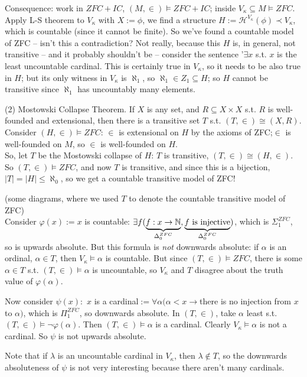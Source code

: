 \documentclass[a4paper]{article}
\begin{document}
Consequence: work in $ZFC+IC$, $(M,\in) \vDash ZFC+IC$; inside $V_\kappa \subseteq M \vDash ZFC$. Apply L-S theorem to $V_\kappa$ with $X:=\phi$, we find a structure $H:=\mathcal{H}^{V_\kappa} (\phi) \prec V_\kappa$, which is countable (since it cannot be finite). So we've found a countable model of ZFC -- isn't this a contradiction? Not really, because this $H$ is, in general, not transitive -- and it probably shouldn't be -- consider the sentence '$\exists x$ s.t. $x$ is the least uncountable cardinal. This is certainly true in $V_\kappa$, so it needs to be also true in $H$; but its only witness in $V_\kappa$ is $\aleph_1$, so $\aleph_1 \in Z_1 \subseteq H$; so $H$ cannot be transitive since $\aleph_1$ has uncountably many elements.

(2) Mostowski Collapse Theorem. If $X$ is any set, and $R \subseteq X \times X$ s.t. $R$ is well-founded and extensional, then there is a transitive set $T$ s.t. $(T,\in) \cong (X,R)$. Consider $(H,\in) \vDash ZFC$: $\in$ is extensional on $H$ by the axioms of ZFC;$\in$ is well-founded on $M$, so $\in$ is well-founded on $H$.\\
So, let $T$ be the Mostowski collapse of $H$: $T$ is transitive, $(T,\in) \cong (H,\in)$. So $(T,\in) \vDash ZFC$, and now $T$ is transitive, and since this is a bijection, $|T| = |H| \leq \aleph_0$, so we get a countable transitive model of ZFC!

(some diagrams, where we used $T$ to denote the countable transitive model of ZFC)\\

Consider $\varphi(x):=x$ is countable: $\exists f(\underbrace{f: x \to \mathbb{N}}_{\Delta_0^{ZFC}}, \underbrace{f \text{ is injective}}_{\Delta_0^{ZFC}})$, which is $\Sigma_1^{ZFC}$, so is upwards absolute. But this formula is \emph{not} downwards absolute: if $\alpha$ is an ordinal, $\alpha \in T$, then $V_\kappa \vDash \alpha$ is countable. But since $(T,\in) \vDash ZFC$, there is some $\alpha \in T$ s.t. $(T,\in) \vDash \alpha$ is uncountable, so $V_\kappa$ and $T$ disagree about the truth value of $\varphi(\alpha)$.

Now consider $\psi(x):$ $x$ is a cardinal$:= \forall \alpha (\alpha < x \to $there is no injection from $x$ to $\alpha)$, which is $\Pi_1^{ZFC}$, so downwards absolute. In $(T,\in)$, take $\alpha$ least s.t. $(T,\in) \vDash \neg \varphi(\alpha)$. Then $(T,\in) \vDash \alpha$ is a cardinal. Clearly $V_\kappa \vDash \alpha$ is not a cardinal. So $\psi$ is not upwards absolute.

Note that if $\lambda$ is an uncountable cardinal in $V_\kappa$, then $\lambda \not\in T$, so the downwards absoluteness of $\psi$ is not very interesting because there aren't many cardinals.
\end{document}
